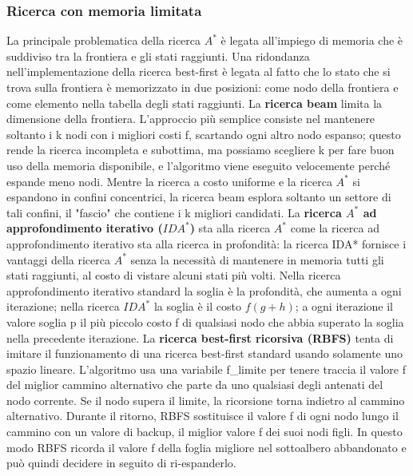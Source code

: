 \documentclass{article}
\begin{document}
\subsubsection{Ricerca con memoria limitata}
La principale problematica della ricerca $A^*$ è legata all'impiego di memoria che è suddiviso tra la frontiera e gli stati raggiunti. Una ridondanza nell'implementazione della ricerca best-first è legata al fatto che lo stato che si trova sulla frontiera è memorizzato in due posizioni: come nodo della frontiera e come elemento nella tabella degli stati raggiunti.\newline
La \textbf{ricerca beam} limita la dimensione della frontiera. L'approccio più semplice consiste nel mantenere soltanto i k nodi con i migliori costi f, scartando ogni altro nodo espanso; questo rende la ricerca incompleta e subottima, ma possiamo scegliere k per fare buon uso della memoria disponibile, e l'algoritmo viene eseguito velocemente perché espande meno nodi. \newline
Mentre la ricerca a costo uniforme e la ricerca $A^*$ si espandono in confini concentrici, la ricerca beam esplora soltanto un settore di tali confini, il "fascio" che contiene i k migliori candidati.\newline
La \textbf{ricerca $A^*$ ad approfondimento iterativo ($IDA^*$)} sta alla ricerca $A^*$ come la ricerca ad approfondimento iterativo sta alla ricerca in profondità: la ricerca IDA* fornisce i vantaggi della ricerca $A^*$ senza la necessità di mantenere in memoria tutti gli stati raggiunti, al costo di vistare alcuni stati più volti. Nella ricerca approfondimento iterativo standard la soglia è la profondità, che aumenta a ogni iterazione; nella ricerca $IDA^*$ la soglia è il costo $f(g+h)$; a ogni iterazione il valore soglia p il più piccolo costo f di qualsiasi nodo che abbia superato la soglia nella precedente iterazione.\newline
La \textbf{ricerca best-first ricorsiva (RBFS)} tenta di imitare il funzionamento di una ricerca best-first standard usando solamente uno spazio lineare.  L'algoritmo usa una variabile f\_limite per tenere traccia il valore f del miglior cammino alternativo che parte da uno qualsiasi degli antenati del nodo corrente. Se il nodo supera il limite, la ricorsione torna indietro al cammino alternativo. Durante il ritorno, RBFS sostituisce il valore f di ogni nodo lungo il cammino con un valore di backup, il miglior valore f dei suoi nodi figli.  In questo modo RBFS ricorda il valore f della foglia migliore nel sottoalbero abbandonato e può quindi decidere in seguito di ri-espanderlo. \newline
\end{document}
